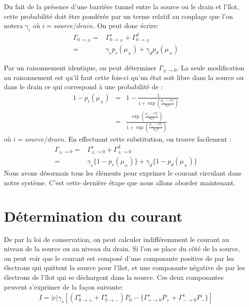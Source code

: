 Du fait de la présence d'une barrière tunnel entre la source ou le drain et l'\^ilot, cette probabilité doit être pondérée par un terme relatif au couplage que l'on notera $\gamma_i$ où $i=source/drain$.
On peut donc écrire:
\begin{eqnarray}
\Gamma_{0 \rightarrow \pm} =& \Gamma_{0 \rightarrow \pm}^s + \Gamma_{0 \rightarrow \pm}^d  \nonumber \\
 =& \gamma_s p_s(\mu_\pm) + \gamma_d p_d(\mu_\pm)
\end{eqnarray}

Par un raisonnement identique, on peut déterminer $\Gamma_{\pm \rightarrow 0}$. La seule modification au raisonnement est qu'il faut cette fois-ci qu'un état soit libre dans la source ou dans le drain ce qui correspond à une probabilité de :
\begin{eqnarray}
1 - p_i(\mu_\pm) &=& 1 - \frac{1}{1 + \exp{(\frac{\mu_\pm - eV_i}{k_bT})}} \nonumber \\
 &=& \frac{\exp{(\frac{\mu_\pm - eV_i}{k_bT})}}{1 + \exp{(\frac{\mu_\pm - eV_i}{k_bT})}}
\end{eqnarray}
où $i=source/drain$.
En effectuant cette substitution, on trouve facilement :
\begin{eqnarray}
\Gamma_{\pm \rightarrow 0} =& \Gamma_{\pm \rightarrow 0}^s + \Gamma_{\pm \rightarrow 0}^d  \nonumber \\
 =& \gamma_s \{1 - p_s(\mu_\pm)\} + \gamma_d \{1-p_d(\mu_\pm)\}
\end{eqnarray}
Nous avons désormais tous les éléments pour exprimer le courant circulant dans notre système. C'est cette dernière étape que nous allons aborder maintenant.
\section{Détermination du courant}
De par la loi de conservation, on peut calculer indifféremment le courant au niveau de la source ou au niveau du drain. Si l'on se place du c\^oté de la source, on peut voir que le courant est composé d'une composante positive de par les électrons qui quittent la source pour l'\^ilot, et une composante négative  de par les électrons de l'\^ilot qui se déchargent dans la source. Ces deux composantes peuvent s'exprimer de la façon suivante:
\begin{eqnarray}
I = |e| \gamma_s [(\Gamma_{0 \rightarrow +}^s + \Gamma_{0 \rightarrow -}^s) P_0 - \{ \Gamma_{+ \rightarrow 0}^s P_{+} + \Gamma_{- \rightarrow 0}^s P_{-}  \}]
\end{eqnarray}


